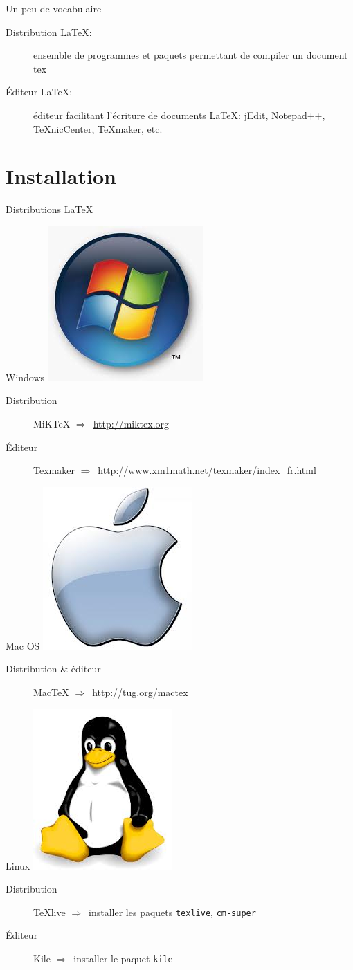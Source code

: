 \documentclass{beamer}
\begin{document}
\begin{frame}{Un peu de vocabulaire}
    \begin{description}
        \item[Distribution \LaTeX :] ensemble de programmes et paquets permettant de compiler un document tex
        \item[Éditeur \LaTeX       :] éditeur facilitant l'écriture de documents \LaTeX: jEdit, Notepad++, TeXnicCenter, TeXmaker, etc.
    \end{description}
\end{frame}



\section{Installation} 

\newcommand{\bul}{$\Rightarrow$\ }

\begin{frame}{Distributions \LaTeX}
    \begin{block}{Windows \includegraphics[width=0.6 cm]{img/logo_win7} }
        \begin{description}
            \item[Distribution] MiK\TeX{} \bul \url{http://miktex.org}
            \item[Éditeur] Texmaker \bul \footnotesize\url{http://www.xm1math.net/texmaker/index_fr.html}
        \end{description}
    \end{block}
    \begin{block}{Mac OS \includegraphics[width=0.6 cm]{img/logo_apple} }
        \begin{description}
            \item[Distribution \& éditeur] Mac\TeX{} \bul \url{http://tug.org/mactex}
        \end{description}
    \end{block}
    \begin{block}{Linux \includegraphics[width=0.6 cm]{img/logo_linux}}
        \begin{description}
            \item[Distribution] TeXlive \bul installer les paquets \texttt{texlive}, \texttt{cm-super}
            \item[Éditeur] Kile \bul installer le paquet \texttt{kile}
        \end{description}
    \end{block}
\end{frame}
\end{document}
